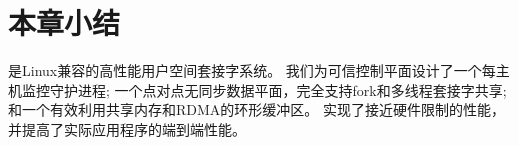 \section{本章小结}
\label{socksdirect:sec:conclusion}

\sys {}是Linux兼容的高性能用户空间套接字系统。
我们为可信控制平面设计了一个每主机监控守护进程;
一个点对点无同步数据平面，完全支持fork和多线程套接字共享;
和一个有效利用共享内存和RDMA的环形缓冲区。
\sys {}实现了接近硬件限制的性能，并提高了实际应用程序的端到端性能。

